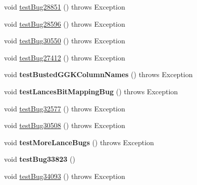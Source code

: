 \begin{DoxyCompactItemize}
\item 
void \mbox{\hyperlink{classtestsuite_1_1regression_1_1_statement_regression_test_a466a50de4804c830422e6b7e6a9c9653}{test\+Bug28851}} ()  throws Exception 
\item 
void \mbox{\hyperlink{classtestsuite_1_1regression_1_1_statement_regression_test_a1d616199f65aad8a199b762687ef4880}{test\+Bug28596}} ()  throws Exception 
\item 
void \mbox{\hyperlink{classtestsuite_1_1regression_1_1_statement_regression_test_a04e7c997d4e285f4538f897d61c1110e}{test\+Bug30550}} ()  throws Exception 
\item 
void \mbox{\hyperlink{classtestsuite_1_1regression_1_1_statement_regression_test_a8fe44dff0f28bc878c51eb27e789c9b4}{test\+Bug27412}} ()  throws Exception 
\item 
\mbox{\label{classtestsuite_1_1regression_1_1_statement_regression_test_a26becb1c5466427e8a1b403274a72a73}} 
void {\bfseries test\+Busted\+G\+G\+K\+Column\+Names} ()  throws Exception 
\item 
\mbox{\label{classtestsuite_1_1regression_1_1_statement_regression_test_a2774bec021fba29b36078391bb2d3363}} 
void {\bfseries test\+Lances\+Bit\+Mapping\+Bug} ()  throws Exception 
\item 
void \mbox{\hyperlink{classtestsuite_1_1regression_1_1_statement_regression_test_a46c9677cc1878bfd4f5da911d30cac02}{test\+Bug32577}} ()  throws Exception 
\item 
void \mbox{\hyperlink{classtestsuite_1_1regression_1_1_statement_regression_test_a7cb27931fda37ceec6733fcd0e95ced5}{test\+Bug30508}} ()  throws Exception 
\item 
\mbox{\label{classtestsuite_1_1regression_1_1_statement_regression_test_afd9228e69b7dd6bbe30d716cebeac729}} 
void {\bfseries test\+More\+Lance\+Bugs} ()  throws Exception 
\item 
\mbox{\label{classtestsuite_1_1regression_1_1_statement_regression_test_a5d8cd5c61277cdedeb6ba9bb4626f26e}} 
void {\bfseries test\+Bug33823} ()
\item 
void \mbox{\hyperlink{classtestsuite_1_1regression_1_1_statement_regression_test_accd5c83c1b95ec64b7d7868f9ea2be99}{test\+Bug34093}} ()  throws Exception 

\end{DoxyCompactItemize}

